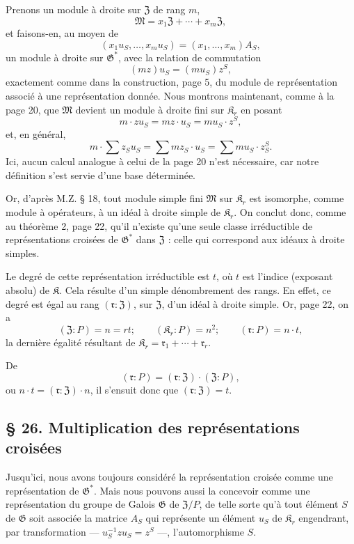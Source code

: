 Prenons un module à droite sur \(\mathfrak Z\) de rang \(m\),
\[
\mathfrak{M}=x_1\mathfrak{Z}+\cdots+x_m\mathfrak{Z},
\]
et faisons-en, au moyen de
\[
(x_1u_S,\ldots,x_mu_S)=(x_1,\ldots,x_m)A_S,
\]
un module à droite sur \(\mathfrak G^*\), avec la relation de commutation
\[
(mz) u_S = (mu_S) z^S,
\]
exactement comme dans la construction, page 5, du module de représentation associé à une représentation donnée. Nous montrons maintenant, comme à la page 20, que \(\mathfrak M\) devient un module à droite fini sur \(\mathfrak K_r\) en posant
\[
m \cdot z u_S = mz \cdot u_S = mu_S \cdot z^S,
\]
et, en général,
\[
m \cdot \sum z_S u_S = \sum m z_S \cdot u_S = \sum m u_S \cdot z_S^S.
\]
Ici, aucun calcul analogue à celui de la page 20 n'est nécessaire, car notre définition s'est servie d'une base déterminée.

Or, d'après M.Z. \S{} 18, tout module simple fini \(\mathfrak M\) sur \(\mathfrak K_r\) est isomorphe, comme module à opérateurs, à un idéal à droite simple de \(\mathfrak K_r\). On conclut donc, comme au théorème 2, page 22, qu'il n'existe qu'une seule classe irréductible de représentations croisées de \(\mathfrak G^*\) dans \(\mathfrak Z\) : celle qui correspond aux idéaux à droite simples.

Le degré de cette représentation irréductible est \(t\), où \(t\) est l'indice (exposant absolu) de \(\mathfrak K\). Cela résulte d'un simple dénombrement des rangs. En effet, ce degré est égal au rang \((\mathfrak r:\mathfrak Z)\), sur \(\mathfrak Z\), d'un idéal à droite simple. Or, page 22, on a
\[
(\mathfrak Z:P)=n=rt;\qquad (\mathfrak K_r:P)=n^2;\qquad (\mathfrak r:P)=n\cdot t,
\]
la dernière égalité résultant de \(\mathfrak K_r = \mathfrak r_1 + \cdots + \mathfrak r_r\).

De
\[
(\mathfrak{r}:P)=(\mathfrak{r}:\mathfrak Z)\cdot(\mathfrak Z:P),
\]
ou \(n\cdot t=(\mathfrak r:\mathfrak Z)\cdot n\), il s'ensuit donc que \((\mathfrak r:\mathfrak Z)=t\).

\subsection*{\S{} 26. Multiplication des représentations croisées}\label{fr-r823-multiplication-representations-croisees}

Jusqu'ici, nous avons toujours considéré la représentation croisée comme une représentation de \(\mathfrak G^*\). Mais nous pouvons aussi la concevoir comme une représentation du groupe de Galois \(\mathfrak G\) de \(\mathfrak Z/P\), de telle sorte qu'à tout élément \(S\) de \(\mathfrak G\) soit associée la matrice \(A_S\) qui représente un élément \(u_S\) de \(\mathfrak K_r\) engendrant, par transformation --- \(u_S^{-1}zu_S=z^S\) ---, l'automorphisme \(S\).

